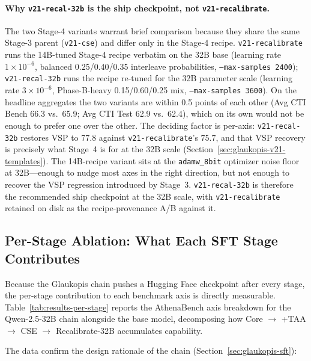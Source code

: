 \documentclass[unnumsec,webpdf,contemporary,large]{oup-authoring-template}
\theoremstyle{thmstyleone}
\theoremstyle{thmstyletwo}
\theoremstyle{thmstylethree}
\begin{document}
\paragraph{Why \texttt{v21-recal-32b} is the ship checkpoint, not \texttt{v21-recalibrate}.}
The two Stage-4 variants warrant brief comparison because they share the same Stage-3 parent (\texttt{v21-cse}) and differ only in the Stage-4 recipe. \texttt{v21-recalibrate} runs the 14B-tuned Stage-4 recipe verbatim on the 32B base (learning rate $1\times 10^{-6}$, balanced 0.25/0.40/0.35 interleave probabilities, \texttt{--max-samples 2400}); \texttt{v21-recal-32b} runs the recipe re-tuned for the 32B parameter scale (learning rate $3\times 10^{-6}$, Phase-B-heavy 0.15/0.60/0.25 mix, \texttt{--max-samples 3600}). On the headline aggregates the two variants are within 0.5 points of each other (Avg CTI Bench 66.3 vs.\ 65.9; Avg CTI Test 62.9 vs.\ 62.4), which on its own would not be enough to prefer one over the other. The deciding factor is per-axis: \texttt{v21-recal-32b} restores VSP to 77.8 against \texttt{v21-recalibrate}'s 75.7, and that VSP recovery is precisely what Stage~4 is for at the 32B scale (Section~\ref{sec:glaukopis-v21-templates}). The 14B-recipe variant sits at the \texttt{adamw\_8bit} optimizer noise floor at 32B---enough to nudge most axes in the right direction, but not enough to recover the VSP regression introduced by Stage~3. \texttt{v21-recal-32b} is therefore the recommended ship checkpoint at the 32B scale, with \texttt{v21-recalibrate} retained on disk as the recipe-provenance A/B against it.

\subsection{Per-Stage Ablation: What Each SFT Stage Contributes}
\label{sec:results-per-stage}

Because the Glaukopis chain pushes a Hugging Face checkpoint after every stage, the per-stage contribution to each benchmark axis is directly measurable. Table~\ref{tab:results-per-stage} reports the AthenaBench axis breakdown for the Qwen-2.5-32B chain alongside the base model, decomposing how Core $\to$ +TAA $\to$ CSE $\to$ Recalibrate-32B accumulates capability.

The data confirm the design rationale of the chain (Section~\ref{sec:glaukopis-sft}):
\end{document}
